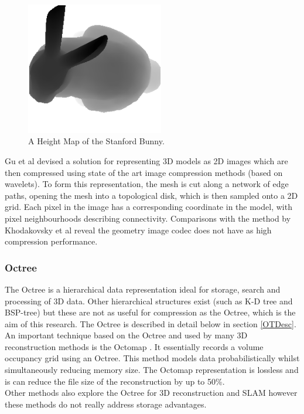 \begin{figure}[!htb]
\centering
\includegraphics[width=6cm]{images/literature/HeightMap}
\caption{A Height Map of the Stanford Bunny.}
\label{fig:HeightMapExample}
\end{figure}

Gu et al \cite{Gu02Geometry} devised a solution for representing 3D models as 2D images which are then compressed using state of the art image compression methods (based on wavelets). To form this representation, the mesh is cut along a network of edge paths, opening the mesh into a topological disk, which is then sampled onto a 2D grid. Each pixel in the image has a corresponding coordinate in the model, with pixel neighbourhoods describing connectivity. Comparisons with the method by Khodakovsky et al reveal the geometry image codec does not have as high compression performance. \\


\subsubsection{Octree}

The Octree is a hierarchical data representation ideal for storage, search and processing of 3D data. Other hierarchical structures exist (such as K-D tree and BSP-tree) \cite{Samet06Foundations} but these are not as useful for compression as the Octree, which is the aim of this research. The Octree is described in detail below in section \ref{OTDesc}. An important technique based on the Octree and used by many 3D reconstruction methods is the Octomap \cite{Wurm10Octomap}. It essentially records a volume occupancy grid using an Octree. This method models data probabilistically whilst simultaneously reducing memory size. The Octomap representation is lossless and is can reduce the file size of the reconstruction by up to 50\%. \\

Other methods also explore the Octree for 3D reconstruction and SLAM \cite{Fournier07Mapping,Meagher82Geometric,Fairfield07Real} however these methods do not really address storage advantages. 



